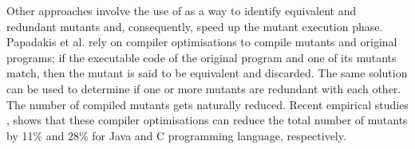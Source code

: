 Other approaches involve the use of  \cite{papadakis2015trivial,kintis2017detecting} as a way to identify equivalent and redundant mutants and, consequently, speed up the mutant execution phase. Papadakis et al. \cite{papadakis2015trivial, kintis2017detecting} rely on compiler optimisations to compile mutants and original programs; if the executable code of the original program and one of its mutants match, then the mutant is said to be equivalent and discarded. The same solution can be used to determine if one or more mutants are redundant with each other. The number of compiled mutants gets naturally reduced. Recent empirical studies \cite{kintis2017detecting}, shows that these compiler optimisations can reduce the total number of mutants by 11\% and 28\% for Java and C programming language, respectively.
